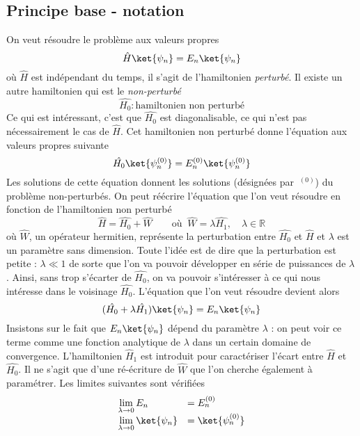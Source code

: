 	\subsection{Principe base - notation}
	On veut résoudre le problème aux valeurs propres 
	\begin{equation}
	\hat{H}\ket{\psi_n} = E_n\ket{\psi_n}
	\end{equation}
	où $\hat{H}$ est indépendant du temps, il s'agit de l'hamiltonien \textit{perturbé}.
	Il existe un autre hamiltonien qui est le \textit{non-perturbé}
	\begin{equation}
	\hat{H_0} : \text{hamiltonien non perturbé}
	\end{equation}
	Ce qui est intéressant, c'est que $\hat{H_0}$ est diagonalisable, ce qui n'est pas 
	nécessairement le cas de $\hat{H}$. Cet hamiltonien non perturbé donne l'équation 
	aux valeurs propres suivante
	\begin{equation}
	\hat{H_0}\ket{\psi_n^{(0)}} = E_n^{(0)}\ket{\psi_n^{(0)}}
	\end{equation}				
	Les solutions de cette équation donnent les solutions (désignées par $\ ^{(0)}$) du 
	problème non-perturbés. 	On peut réécrire l'équation que l'on veut résoudre en fonction 
	de l’hamiltonien non perturbé
	\begin{equation}
	\hat{H} = \hat{H_0} + \hat{W}\qquad \text{où }\ \hat{W} = \lambda\hat{H_1},\quad \lambda\in 
	\mathbb{R}
	\end{equation}
	où $\hat{W}$, un opérateur hermitien, représente la perturbation entre $\hat{H_0}$ et $\hat{H}$ 
	et $\lambda$ est un paramètre sans dimension. Toute l'idée est de dire que la perturbation 
	est petite : $\lambda\ll 1$ de sorte que l'on va pouvoir développer en série de puissances de 
	$\lambda$. Ainsi, sans trop s'écarter de $\hat{H_0}$, on va pouvoir s'intéresser à ce qui nous 
	intéresse dans le voisinage $\hat{H_0}$. L'équation que l'on veut résoudre devient alors
	\begin{equation}
	(\hat{H_0}+\lambda\hat{H_1})\ket{\psi_n} = E_n\ket{\psi_n}
	\end{equation}
	Insistons sur le fait que $E_n\ket{\psi_n}$ dépend du paramètre $\lambda$ : on peut voir ce terme
	comme une fonction analytique de $\lambda$ dans un certain domaine de convergence. L'hamiltonien 
	$\hat{H}_1$ est introduit pour caractériser l'écart entre $\hat{H}$ et $\hat{H_0}$. Il ne s'agit 
	que d'une ré-écriture de $\hat{W}$ que l'on cherche également à paramétrer. Les limites suivantes 
	sont vérifiées
	\begin{equation}
	\begin{array}{ll}
	\lim\limits_{\lambda\rightarrow0} E_n &= E_n^{(0)}\\
	\lim\limits_{\lambda\rightarrow0} \ket{\psi_n} &= \ket{\psi_n^{(0)}}
	\end{array}
	\end{equation}
